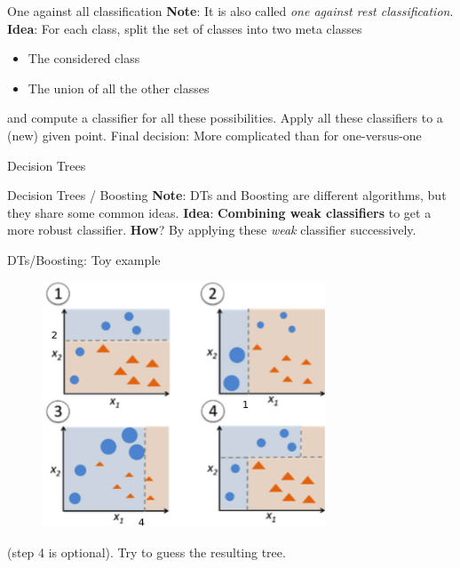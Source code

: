 \documentclass{beamer}
\begin{document}
%
\begin{frame}{One against all classification}
\vfill
\textbf{Note}: It is also called \textit{one against rest classification}.
\vfill
\textbf{Idea}: For each class, split the set of classes into two meta classes
\begin{itemize}
	\item The considered class
	\item The union of all the other classes
\end{itemize}
and compute a classifier for all these possibilities.
Apply all these classifiers to a (new) given point.
\vfill
Final decision: More complicated than for one-versus-one
\end{frame}
%
\begin{frame}
\begin{center}
\Huge{Decision Trees}
\end{center}
\end{frame}

\begin{frame}{Decision Trees / Boosting}
\vfill
\textbf{Note}: DTs and Boosting are different algorithms, but they share some common ideas.
\vfill
\textbf{Idea}: \textbf{Combining weak classifiers} to get a more robust classifier.
\vfill
\textbf{How}? By applying these \textit{weak} classifier successively. 
\end{frame}

\begin{frame}{DTs/Boosting: Toy example}
\begin{figure}
\centering
\includegraphics[width=0.75\textwidth]{images/boosting.png}
\end{figure}
(step 4 is optional). Try to guess the resulting tree.
\end{frame}
\end{document}
